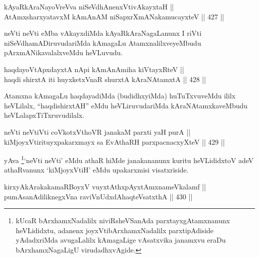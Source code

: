 

\begin{shl}
kAyaRkAraNayoVreVva niSeVdhAnenxVtivAkayxtaH || \\
AtAmxsharxyatavxM kAmAnAM niSapxrXmANakamucayxteV \hfill || 427 ||  
\end{shl}

\begin{artha}
neVti neVti eMba vAkayxdiMda kAyaRkAraNagaLanunx I riVti
niSeVdhamADiruvudariMda kAmagaLu AtamxnalilxveyeMbudu\break
pArxmANikavalalxveMdu heVLuvudu.
\end{artha}


\begin{shl}
haqdayoVtApxdayxtA nApi kAmAnAmiha kiVtayxRteV || \\
haqdi shirxtA iti huyxketxVnaR shurxtA kAraNAtamxtA \hfill || 428 ||  
\end{shl}

\begin{artha}
Atamxna kAmagaLu haqdayadiMda (budidhxyiMda) huTuTxvuveMdu ililx
heVLilalx, ``haqdishirxtAH'' eMdu heVLiruvudariMda kAraNAtamxkaveMbudu
heVLalapxTiTxruvudilalx.
\end{artha}

\begin{shl}
neVti neVtiVti coVkotxV\s thoVR janakaM parxti yaH purA || \\
kiMjoyxVtirituyxpakarxmayx sa EvAthaRH parxpacnacxyXteV \hfill || 429 ||  
\end{shl}

\begin{artha}
yAva \footnote{kUcaR bArxhamxNadalilx niviRsheVSanAda parxtayxgAtamxnanunx heVLididxtu, adanenx joyxVtibArxhamxNadalilx parxtipAdiside yAdadxriMda avugaLalilx kAmagaLige vAsatxvika janamxvu eraDu bArxhamxNagaLigU virudadhxvAgide.}`neVti neVti' eMdu athaR hiMde janakananunx kuritu heVLididxtoV adeV athaRvanunx `kiMjoyxVtiH' eMdu upakarxmisi visatxriside. 
\end{artha}

\begin{shl}
kirxyAkArakakamaRBoyxV vuyxtAthxpAyx\s \s tAmxnameVkalamf || \\
pumAsanAdiliknegxVna raviVnUdxdAhaqteVsatxthA \hfill || 430 ||  
\end{shl}

